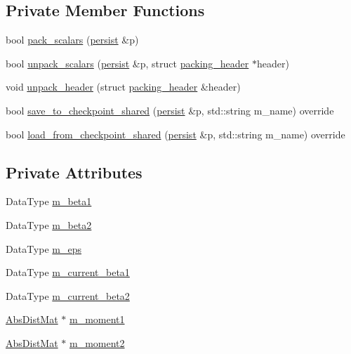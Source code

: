 \subsection*{Private Member Functions}
\begin{DoxyCompactItemize}
\item 
bool \hyperlink{classlbann_1_1adam_a43e941b596c5d1cc68b795b0399398c4}{pack\+\_\+scalars} (\hyperlink{classlbann_1_1persist}{persist} \&p)
\item 
bool \hyperlink{classlbann_1_1adam_a21a3d2bce0bac5e6c022c5d95ec6348b}{unpack\+\_\+scalars} (\hyperlink{classlbann_1_1persist}{persist} \&p, struct \hyperlink{structlbann_1_1adam_1_1packing__header}{packing\+\_\+header} $\ast$header)
\item 
void \hyperlink{classlbann_1_1adam_ae5b6108946e6a09b4e13e4285350aa05}{unpack\+\_\+header} (struct \hyperlink{structlbann_1_1adam_1_1packing__header}{packing\+\_\+header} \&header)
\item 
bool \hyperlink{classlbann_1_1adam_a8070db0a451bdbc6e86200eaa14f6ac7}{save\+\_\+to\+\_\+checkpoint\+\_\+shared} (\hyperlink{classlbann_1_1persist}{persist} \&p, std\+::string m\+\_\+name) override
\item 
bool \hyperlink{classlbann_1_1adam_aca07e925a4751fc5c10a62fb9c72c896}{load\+\_\+from\+\_\+checkpoint\+\_\+shared} (\hyperlink{classlbann_1_1persist}{persist} \&p, std\+::string m\+\_\+name) override
\end{DoxyCompactItemize}
\subsection*{Private Attributes}
\begin{DoxyCompactItemize}
\item 
Data\+Type \hyperlink{classlbann_1_1adam_a73af15a28066edbfad9ba6a900746a19}{m\+\_\+beta1}
\item 
Data\+Type \hyperlink{classlbann_1_1adam_ab1f2a16b8eb7e265895ea9eef3fe87b2}{m\+\_\+beta2}
\item 
Data\+Type \hyperlink{classlbann_1_1adam_a751102f0fd866612f5685050a08020a9}{m\+\_\+eps}
\item 
Data\+Type \hyperlink{classlbann_1_1adam_a53c3034e187da2720447bbb4f2b59a5d}{m\+\_\+current\+\_\+beta1}
\item 
Data\+Type \hyperlink{classlbann_1_1adam_ad38376b684d69d4a15da1d11f8808ca7}{m\+\_\+current\+\_\+beta2}
\item 
\hyperlink{base_8hpp_a9a697a504ae84010e7439ffec862b470}{Abs\+Dist\+Mat} $\ast$ \hyperlink{classlbann_1_1adam_aa10a518a5356257bc69e655b88b0ed67}{m\+\_\+moment1}
\item 
\hyperlink{base_8hpp_a9a697a504ae84010e7439ffec862b470}{Abs\+Dist\+Mat} $\ast$ \hyperlink{classlbann_1_1adam_aea3295a0ee7da5e9c56fd6ff2f05c63f}{m\+\_\+moment2}
\end{DoxyCompactItemize}
